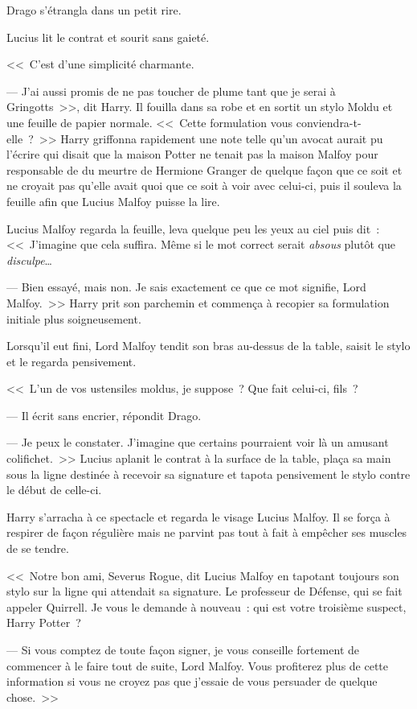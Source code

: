 Drago s'étrangla dans un petit rire.

Lucius lit le contrat et sourit sans gaieté.

<<~C'est d'une simplicité charmante.

--- J'ai aussi promis de ne pas toucher de plume tant que je serai à Gringotts~>>, dit Harry. Il fouilla dans sa robe et en sortit un stylo Moldu et une feuille de papier normale. <<~Cette formulation vous conviendra-t-elle~?~>> Harry griffonna rapidement une note telle qu'un avocat aurait pu l'écrire qui disait que la maison Potter ne tenait pas la maison Malfoy pour responsable de du meurtre de Hermione Granger de quelque façon que ce soit et ne croyait pas qu'elle avait quoi que ce soit à voir avec celui-ci, puis il souleva la feuille afin que Lucius Malfoy puisse la lire.

Lucius Malfoy regarda la feuille, leva quelque peu les yeux au ciel puis dit~:
<<~J'imagine que cela suffira. Même si le mot correct serait \emph{absous} plutôt que \emph{disculpe}…

--- Bien essayé, mais non. Je sais exactement ce que ce mot signifie, Lord Malfoy.~>> Harry prit son parchemin et commença à recopier sa formulation initiale plus soigneusement.

Lorsqu'il eut fini, Lord Malfoy tendit son bras au-dessus de la table, saisit le stylo et le regarda pensivement.

<<~L'un de vos ustensiles moldus, je suppose~? Que fait celui-ci, fils~?

--- Il écrit sans encrier, répondit Drago.

--- Je peux le constater. J'imagine que certains pourraient voir là un amusant colifichet.~>> Lucius aplanit le contrat à la surface de la table, plaça sa main sous la ligne destinée à recevoir sa signature et tapota pensivement le stylo contre le début de celle-ci.

Harry s'arracha à ce spectacle et regarda le visage Lucius Malfoy. Il se força à respirer de façon régulière mais ne parvint pas tout à fait à empêcher ses muscles de se tendre.

<<~Notre bon ami, Severus Rogue, dit Lucius Malfoy en tapotant toujours son stylo sur la ligne qui attendait sa signature. Le professeur de Défense, qui se fait appeler Quirrell. Je vous le demande à nouveau~: qui est votre troisième suspect, Harry Potter~?

--- Si vous comptez de toute façon signer, je vous conseille fortement de commencer à le faire tout de suite, Lord Malfoy. Vous profiterez plus de cette information si vous ne croyez pas que j'essaie de vous persuader de quelque chose.~>>


